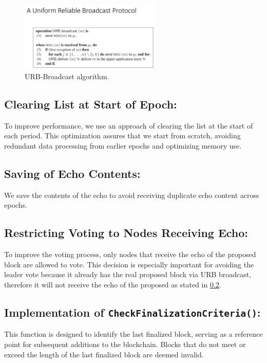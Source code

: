 \documentclass[11pt]{report}
\begin{document}
\vspace{20pt}
\begin{figure}[h]
    \centering
    \includegraphics[width=0.6\textwidth]{urb.png}
    \caption{URB-Broadcast algorithm.}
\end{figure}
\vspace{20pt}

\pagebreak

\subsection{Clearing List at Start of Epoch:}

To improve performance, we use an approach of clearing the list at the start of each period. This optimization assures that we start from scratch, avoiding redundant data processing from earlier epochs and optimizing memory use.

\subsection{Saving of Echo Contents:} \label{2.3}

We save the contents of the echo to avoid receiving duplicate echo content across epochs.

\subsection{Restricting Voting to Nodes Receiving Echo:}

To improve the voting process, only nodes that receive the echo of the proposed block are allowed to vote. This decision is especially important for avoiding the leader vote because it already has the real proposed block via URB broadcast, therefore it will not receive the echo of the proposed as stated in \ref{2.3}.

\subsection{Implementation of \texttt{CheckFinalizationCriteria()}:}

This function is designed to identify the last finalized block, serving as a reference point for subsequent additions to the blockchain. Blocks that do not meet or exceed the length of the last finalized block are deemed invalid.
\end{document}

